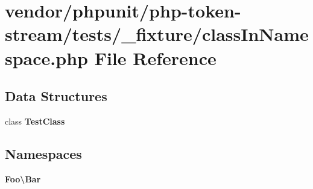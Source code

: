\section{vendor/phpunit/php-\/token-\/stream/tests/\+\_\+fixture/class\+In\+Namespace.php File Reference}
\label{class_in_namespace_8php}
\subsection*{Data Structures}
\begin{DoxyCompactItemize}
\item 
class {\bf Test\+Class}
\end{DoxyCompactItemize}
\subsection*{Namespaces}
\begin{DoxyCompactItemize}
\item 
 {\bf Foo\textbackslash{}\+Bar}
\end{DoxyCompactItemize}
